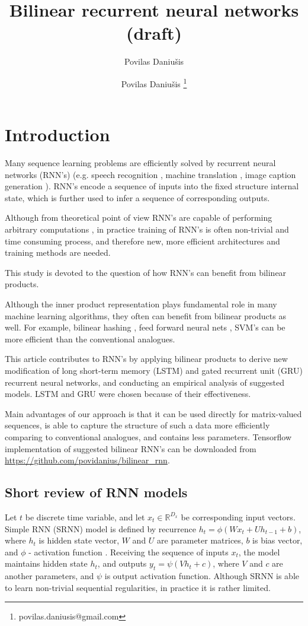 \documentclass[a4paper,11pt]{article}
\author{Povilas Daniu\v{s}is}
\author[1]{Povilas Daniu\v{s}is \thanks{povilas.daniusis@gmail.com}}
\title{Bilinear recurrent neural networks (draft)}
\begin{document}
\maketitle
\section{Introduction}

Many sequence learning problems are efficiently solved by recurrent neural networks (RNN's) (e.g. speech recognition \cite{Sak}, machine translation \cite{Sutskever}, image caption generation \cite{Vinyals}). RNN's encode a sequence of inputs into the fixed structure internal state, which is further used to infer a sequence of corresponding outputs. 



Although from theoretical point of view RNN's are capable of performing arbitrary computations \cite{Siegelmann}, in practice training of RNN's is often non-trivial and time consuming process, and therefore new, more efficient architectures and training methods are needed.

This study is devoted to the question of how RNN's can benefit from bilinear products.

Although the inner product representation plays fundamental role  in many machine learning algorithms, they often can benefit from bilinear products as well. For example, bilinear hashing \cite{Gong}, feed forward neural nets \cite{Daniusis}, SVM's \cite{Cai} can be more efficient than the conventional analogues. 


This article contributes to RNN's by applying bilinear products to derive new modification of long short-term memory (LSTM) \cite{Hochreiter} and gated recurrent unit (GRU) \cite{Chung} recurrent neural networks, and conducting an empirical analysis of suggested models. LSTM and GRU were chosen because of their effectiveness.

Main advantages of our approach is that it can be used directly for matrix-valued sequences, is able to capture the structure of such a data more efficiently comparing to conventional analogues, and contains less parameters. Tensorflow \cite{Tensorflow} implementation of suggested bilinear RNN's can be downloaded from \url{https://github.com/povidanius/bilinear_rnn}.




\subsection{Short review of RNN models}
Let $t$ be discrete time variable, and let $x_{t} \in \mathbb{R}^{D_{x}}$ be corresponding input vectors. Simple RNN (SRNN) model is defined by 
recurrence $h_{t} = \phi(Wx_{t} + Uh_{t-1} + b)$, where $h_{t}$ is hidden state vector, 
$W$ and $U$ are parameter matrices, $b$ is bias vector, and $\phi$ - activation function \cite{Elman}. 
Receiving the sequence of inputs $x_{t}$, the model maintains hidden state $h_{t}$, and 
outputs $y_{t} = \psi(Vh_{t} + c)$, where $V$ and $c$ are another parameters, and $\psi$ is output activation function. Although SRNN is able to learn non-trivial sequential regularities, in practice it is rather limited. 
\end{document}
